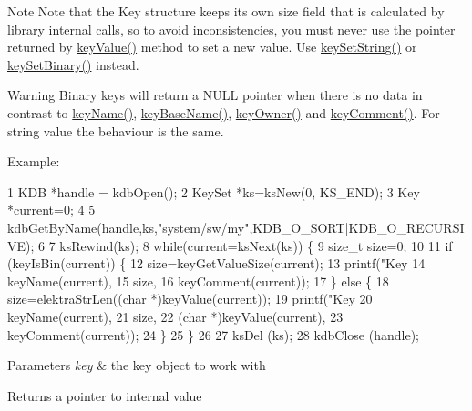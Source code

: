 \begin{DoxyNote}{Note}
Note that the Key structure keeps its own size field that is calculated by library internal calls, so to avoid inconsistencies, you must never use the pointer returned by \hyperlink{group__keyvalue_ga6f29609c5da53c6dc26a98678d5752af}{key\+Value()} method to set a new value. Use \hyperlink{group__keyvalue_ga622bde1eb0e0c4994728331326340ef2}{key\+Set\+String()} or \hyperlink{group__keyvalue_gaa50a5358fd328d373a45f395fa1b99e7}{key\+Set\+Binary()} instead.
\end{DoxyNote}
\begin{DoxyWarning}{Warning}
Binary keys will return a N\+U\+L\+L pointer when there is no data in contrast to \hyperlink{group__keyname_ga8e805c726a60da921d3736cda7813513}{key\+Name()}, \hyperlink{group__keyname_gaaff35e7ca8af5560c47e662ceb9465f5}{key\+Base\+Name()}, \hyperlink{group__meta_gaf6485fb8599714b6bbd830cf915ffea5}{key\+Owner()} and \hyperlink{group__meta_gac89fd319783b3457db45b4c09e55274a}{key\+Comment()}. For string value the behaviour is the same.
\end{DoxyWarning}
\begin{DoxyParagraph}{Example\+:}

\begin{DoxyCode}
1 KDB *handle = kdbOpen();
2 KeySet *ks=ksNew(0, KS\_END);
3 Key *current=0;
4 
5 kdbGetByName(handle,ks,"system/sw/my",KDB\_O\_SORT|KDB\_O\_RECURSIVE);
6 
7 ksRewind(ks);
8 while(current=ksNext(ks)) \{
9         size\_t size=0;
10         
11         if (keyIsBin(current)) \{
12                 size=keyGetValueSize(current);
13                 printf("Key %
14                         keyName(current),
15                         size,
16                         keyComment(current));
17         \} else \{
18                 size=elektraStrLen((char *)keyValue(current));
19                 printf("Key %
20                         keyName(current),
21                         size,
22                         (char *)keyValue(current),
23                         keyComment(current));
24         \}
25 \}
26 
27 ksDel (ks);
28 kdbClose (handle);
\end{DoxyCode}

\end{DoxyParagraph}

\begin{DoxyParams}{Parameters}
{\em key} & the key object to work with \\
\hline
\end{DoxyParams}
\begin{DoxyReturn}{Returns}
a pointer to internal value 
\end{DoxyReturn}

